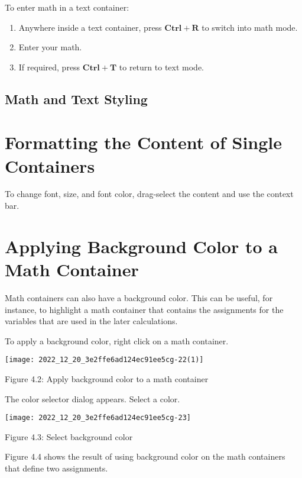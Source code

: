 To enter math in a text container:

\begin{enumerate}
  \item Anywhere inside a text container, press $\mathbf{C t r l}+\mathbf{R}$ to switch into math mode.

  \item Enter your math.

  \item If required, press $\mathbf{C t r l}+\mathbf{T}$ to return to text mode.

\end{enumerate}

\subsection{Math and Text Styling}
\section{Formatting the Content of Single Containers}
To change font, size, and font color, drag-select the content and use the context bar.

\section{Applying Background Color to a Math Container}
Math containers can also have a background color. This can be useful, for instance, to highlight a math container that contains the assignments for the variables that are used in the later calculations.

To apply a background color, right click on a math container.

\begin{center}
\texttt{[image: 2022\_12\_20\_3e2ffe6ad124ec91ee5cg-22(1)]}
\end{center}

Figure 4.2: Apply background color to a math container

The color selector dialog appears. Select a color.

\begin{center}
\texttt{[image: 2022\_12\_20\_3e2ffe6ad124ec91ee5cg-23]}
\end{center}

Figure 4.3: Select background color

Figure 4.4 shows the result of using background color on the math containers that define two assignments.

